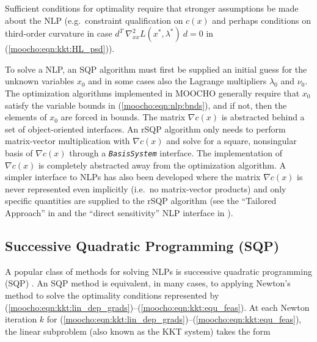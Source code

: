 \documentclass[pdf,ps2pdf,11pt]{SANDreport}
\begin{document}
{Sufficient conditions for optimality require that stronger assumptions
be made about the NLP (e.g.~constraint qualification on $c(x)$ and
perhaps conditions on third-order curvature in case $d^T
\: \nabla_{xx}^2 L(x^*,\lambda^*) \: d = 0$ in
(\ref{moocho:eqn:kkt:HL_psd})).

To solve a NLP, an SQP algorithm must first be supplied an initial
guess for the unknown variables $x_0$ and in some cases also the
Lagrange multipliers $\lambda_0$ and $\nu_0$.  The optimization
algorithms implemented in MOOCHO generally require that $x_0$ satisfy
the variable bounds in (\ref{moocho:eqn:nlp:bnds}), and if not, then
the elements of $x_0$ are forced in bounds.  The matrix $\nabla c(x)$
is abstracted behind a set of object-oriented interfaces.  An rSQP
algorithm only needs to perform matrix-vector multiplication with
$\nabla c(x)$ and solve for a square, nonsingular basis of $\nabla
c(x)$ through a \texttt{\textit{BasisSystem}} interface.  The
implementation of $\nabla c(x)$ is completely abstracted away from the
optimization algorithm.  A simpler interface to NLPs has also been
developed where the matrix $\nabla c(x)$ is never represented even
implicitly (i.e.~no matrix-vector products) and only specific
quantities are supplied to the rSQP algorithm (see the ``Tailored
Approach'' in \cite{ref:schmid_rsqp_1994} and the ``direct
sensitivity'' NLP interface in \cite{ref:moochodevguide}).

%
\subsection{Successive Quadratic Programming (SQP)}
\label{moocho:sec:SQP}
%

A popular class of methods for solving NLPs is successive quadratic
programming (SQP) \cite{ref:boggs_tolle_1996}.  An SQP method is
equivalent, in many cases, to applying Newton's method to solve the
optimality conditions represented by
(\ref{moocho:eqn:kkt:lin_dep_grads})--(\ref{moocho:eqn:kkt:equ_feas}).
At each Newton iteration $k$ for
(\ref{moocho:eqn:kkt:lin_dep_grads})--(\ref{moocho:eqn:kkt:equ_feas}),
the linear subproblem (also known as the KKT system) takes the form

}
\end{document}
